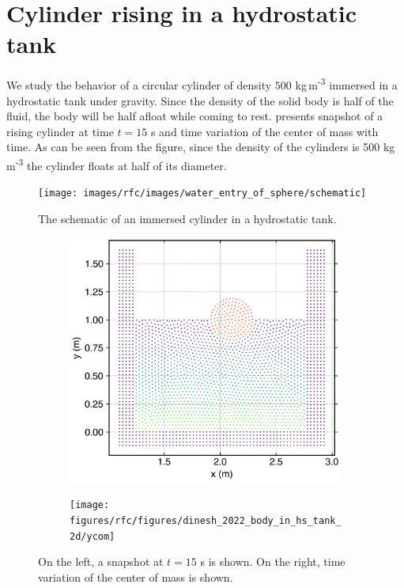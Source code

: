 \FloatBarrier%
\section{Cylinder rising in a hydrostatic tank}
\label{sec:water-entry-sphere}
We study the behavior of a circular cylinder of density $500$
kg\,m\textsuperscript{-3} immersed in a hydrostatic tank under gravity. Since
the density of the solid body is half of the fluid, the body will be half afloat
while coming to rest.  presents
snapshot of a rising cylinder at time $t=15$ s and time variation of the center
of mass with time. As can be seen from the figure, since the density of the
cylinders is 500 kg\,m\textsuperscript{-3} the cylinder floats at half of its
diameter.
\begin{figure}[!htpb]
  \centering
    \texttt{[image: images/rfc/images/water\_entry\_of\_sphere/schematic]}
  \caption{The schematic of an immersed cylinder in a hydrostatic tank.}
\label{fig:raising-falling-solid-in-water}
\end{figure}

\begin{figure}[!htpb]
  \centering
  \begin{subfigure}{0.48\textwidth}
    \centering
    \includegraphics[width=1.0\textwidth]{figures/rfc/figures/dinesh_2022_body_in_hs_tank_2d/time11}
  \end{subfigure}
  \begin{subfigure}{0.48\textwidth}
    \centering
    \texttt{[image: figures/rfc/figures/dinesh\_2022\_body\_in\_hs\_tank\_2d/ycom]}
  \end{subfigure}
  \caption{
    On the left, a snapshot at $t=15$ s is shown. On the right,
    time variation of the center of mass is shown.}
\label{fig:snapshots-rising-solid-in-water}
\end{figure}
